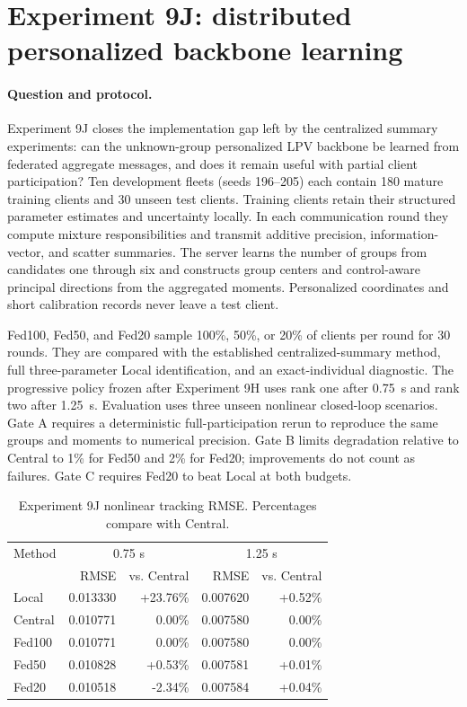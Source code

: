 \section{Experiment 9J: distributed personalized backbone learning}
\label{sec:experiment9j}

\paragraph{Question and protocol.}
Experiment 9J closes the implementation gap left by the centralized summary
experiments: can the unknown-group personalized LPV backbone be learned from
federated aggregate messages, and does it remain useful with partial client
participation? Ten development fleets (seeds 196--205) each contain 180 mature
training clients and 30 unseen test clients. Training clients retain their
structured parameter estimates and uncertainty locally. In each communication
round they compute mixture responsibilities and transmit additive precision,
information-vector, and scatter summaries. The server learns the number of
groups from candidates one through six and constructs group centers and
control-aware principal directions from the aggregated moments. Personalized
coordinates and short calibration records never leave a test client.

Fed100, Fed50, and Fed20 sample 100\%, 50\%, or 20\% of clients per round for
30 rounds. They are compared with the established centralized-summary method,
full three-parameter Local identification, and an exact-individual diagnostic.
The progressive policy frozen after Experiment 9H uses rank one after 0.75~s and
rank two after 1.25~s. Evaluation uses three unseen nonlinear closed-loop
scenarios. Gate A requires a deterministic full-participation rerun to reproduce
the same groups and moments to numerical precision. Gate B limits degradation
relative to Central to 1\% for Fed50 and 2\% for Fed20; improvements do not count
as failures. Gate C requires Fed20 to beat Local at both budgets.

\begin{table}[htbp]
\centering
\caption{Experiment 9J nonlinear tracking RMSE. Percentages compare with Central.}
\label{tab:experiment9j-results}
\begin{tabular}{lrrrr}
\toprule
Method & \multicolumn{2}{c}{0.75 s} & \multicolumn{2}{c}{1.25 s}\\
 & RMSE & vs. Central & RMSE & vs. Central\\
\midrule
Local   & 0.013330 & +23.76\% & 0.007620 & +0.52\%\\
Central & 0.010771 & 0.00\%   & 0.007580 & 0.00\%\\
Fed100  & 0.010771 & 0.00\%   & 0.007580 & 0.00\%\\
Fed50   & 0.010828 & +0.53\%  & 0.007581 & +0.01\%\\
Fed20   & 0.010518 & -2.34\%  & 0.007584 & +0.04\%\\
\bottomrule
\end{tabular}
\end{table}

